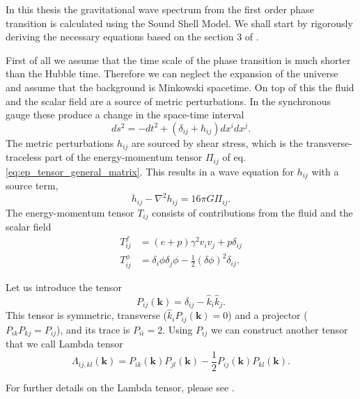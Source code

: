 In this thesis the gravitational wave spectrum from the first order phase transition is calculated using the Sound Shell Model.
We shall start by rigorously deriving the necessary equations based on the section 3 of \cite{hindmarsh_gw_pt_2019}.

First of all we assume that the time scale of the phase transition is much shorter than the Hubble time.
Therefore we can neglect the expansion of the universe and assume that the background is Minkowski spacetime.
On top of this the fluid and the scalar field are a source of metric perturbations.
In the synchronous gauge these produce a change in the space-time interval
\begin{equation}
ds^2 = -dt^2 + (\delta_{ij} + h_{ij}) dx^i dx^j.
\end{equation}
The metric perturbations $h_{ij}$ are sourced by shear stress,
which is the transverse-traceless part of the energy-momentum tensor $\Pi_{ij}$ of eq. \eqref{eq:ep_tensor_general_matrix}.
This results in a wave equation for $h_{ij}$ with a source term,
\begin{equation}
\ddot{h}_{ij} - \nabla^2 h_{ij} = 16 \pi G \Pi_{ij}.
\end{equation}
The energy-momentum tensor $T_{ij}$ consists of contributions from the fluid and the scalar field
\begin{align}
T^f_{ij}    &= (e+p) \gamma^2 v_i v_j + p \delta_{ij} \\
T^\phi_{ij} &= \delta_i \phi \delta_j \phi - \frac{1}{2}(\delta \phi)^2 \delta_{ij}.
\end{align}

Let us introduce the tensor \cite[eq. 1.35]{maggiore_gw_2008}
\begin{equation}
P_{ij}(\bm{k}) = \delta_{ij} - \hat{k}_i \hat{k}_j.
\end{equation}
This tensor is symmetric, transverse ($\hat{k}_i P_{ij}(\bm{k}) = 0$) and a projector ($P_{ik}P_{kj} = P_{ij}$), and its trace is $P_{ii} = 2$.
Using $P_{ij}$ we can construct another tensor that we call Lambda tensor \cite[eq. 1.36]{maggiore_gw_2008}
\begin{equation}
\Lambda_{ij,kl}(\bm{k}) = P_{ik}(\bm{k}) P_{jl}(\bm{k}) - \frac{1}{2} P_{ij}(\bm{k}) P_{kl}(\bm{k}).
\end{equation}
\iffalse
This is still a projector, in the sense that
\begin{equation}
\Lambda_{ij,kl} \Lambda_{kl,mn} = \Lambda_{ij,mn}.
\end{equation}
It is also transverse on all of its indices as $n^i \Lambda_{ij,kl} = 0$ for all indices ($ijkl$}.
It is traceless with respect to the ($i,j$) and ($k,l$) index pairs,
\begin{equation}
\Lambda_{ii,kl} = \Lambda_{ij,kk} = 0.
\end{equation}
\fi
For further details on the Lambda tensor, please see \cite[ch. 1.2]{maggiore_gw_2008}.

